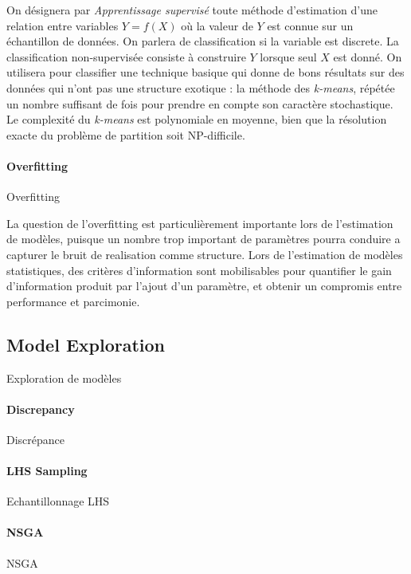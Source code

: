 On désignera par \emph{Apprentissage supervisé} toute méthode d'estimation d'une relation entre variables $Y=f(X)$ où la valeur de $Y$ est connue sur un échantillon de données. On parlera de classification si la variable est discrete. La classification non-supervisée consiste à construire $Y$ lorsque seul $X$ est donné. On utilisera pour classifier une technique basique qui donne de bons résultats sur des données qui n'ont pas une structure exotique : la méthode des \emph{k-means}, répétée un nombre suffisant de fois pour prendre en compte son caractère stochastique. Le complexité du \emph{k-means} est polynomiale en moyenne, bien que la résolution exacte du problème de partition soit NP-difficile.




\paragraph{Overfitting}{Overfitting}


La question de l'overfitting est particulièrement importante lors de l'estimation de modèles, puisque un nombre trop important de paramètres pourra conduire a capturer le bruit de realisation comme structure. Lors de l'estimation de modèles statistiques, des critères d'information sont mobilisables pour quantifier le gain d'information produit par l'ajout d'un paramètre, et obtenir un compromis entre performance et parcimonie.





\subsection*{Model Exploration}{Exploration de modèles}


\paragraph{Discrepancy}{Discrépance}




\paragraph{LHS Sampling}{Echantillonnage LHS}




\paragraph{NSGA}{NSGA}







